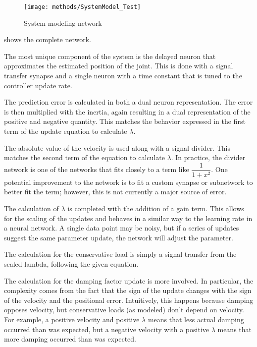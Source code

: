 \begin{figure}
\centering
\texttt{[image: methods/SystemModel\_Test]}
\caption{System modeling network}
\label{fig:SystemModelNetwork}
\end{figure}

 shows the complete network.



The most unique component of the system is the delayed neuron that approximates
the estimated position of the joint. This is done with a signal transfer
synapse and a single neuron with a time constant that is tuned to the controller
update rate.


The prediction error is calculated in both a dual neuron representation. The
error is then multiplied with the inertia, again resulting in a dual 
representation of the positive and negative quantity. This matches the behavior
expressed in the first term of the update equation to calculate $\lambda$.


The absolute value of the velocity is used along with a signal divider. This
matches the second term of the equation to calculate $\lambda$. In practice,
the divider network is one of the networks that fits closely to a term like
$\dfrac{1}{1 + x^{2}}$. One potential improvement to the network is to fit
a custom synapse or subnetwork to better fit the term; however, this is not
currently a major source of error.


The calculation of $\lambda$ is completed with the addition of a gain term. This
allows for the scaling of the updates and behaves in a similar way to the 
learning rate in a neural network. A single data point may be noisy, but if a 
series of updates suggest the same parameter update, the network will adjust the
parameter.


The calculation for the conservative load is simply a signal transfer from the scaled lambda, following the given equation.


The calculation for the damping factor update is more involved. In particular,
the complexity comes from the fact that the sign of the update changes with the
sign of the velocity and the positional error. Intuitively, this happens because
damping opposes velocity, but conservative loads (as modeled) don't depend on
velocity. For example, a positive velocity and positive $\lambda$ means that 
less actual damping occurred than was expected, but a negative velocity with a 
positive $\lambda$ means that more damping occurred than was expected.

